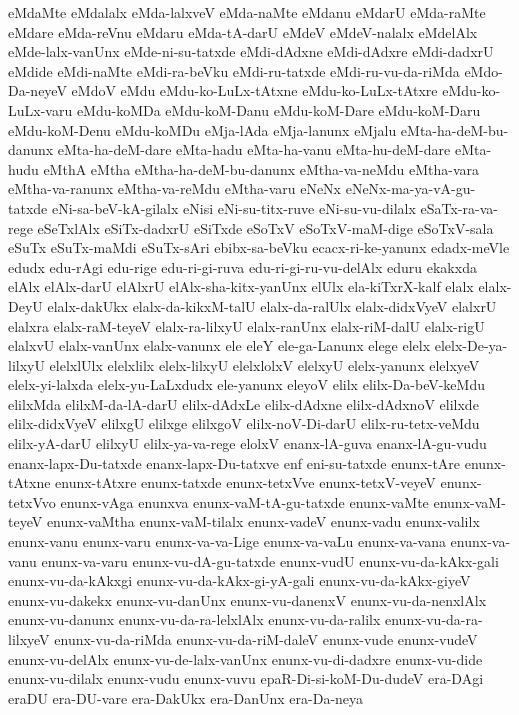 {eMdaMte
eMdalalx
eMda-lalxveV
eMda-naMte
eMdanu
eMdarU
eMda-raMte
eMdare
eMda-reVnu
eMdaru
eMda-tA-darU
eMdeV
eMdeV-nalalx
eMdelAlx
eMde-lalx-vanUnx
eMde-ni-su-tatxde
eMdi-dAdxne
eMdi-dAdxre
eMdi-dadxrU
eMdide
eMdi-naMte
eMdi-ra-beVku
eMdi-ru-tatxde
eMdi-ru-vu-da-riMda
eMdo-Da-neyeV
eMdoV
eMdu
eMdu-ko-LuLx-tAtxne
eMdu-ko-LuLx-tAtxre
eMdu-ko-LuLx-varu
eMdu-koMDa
eMdu-koM-Danu
eMdu-koM-Dare
eMdu-koM-Daru
eMdu-koM-Denu
eMdu-koMDu
eMja-lAda
eMja-lanunx
eMjalu
eMta-ha-deM-bu-danunx
eMta-ha-deM-dare
eMta-hadu
eMta-ha-vanu
eMta-hu-deM-dare
eMta-hudu
eMthA
eMtha
eMtha-ha-deM-bu-danunx
eMtha-va-neMdu
eMtha-vara
eMtha-va-ranunx
eMtha-va-reMdu
eMtha-varu
eNeNx
eNeNx-ma-ya-vA-gu-tatxde
eNi-sa-beV-kA-gilalx
eNisi
eNi-su-titx-ruve
eNi-su-vu-dilalx
eSaTx-ra-va-rege
eSeTxlAlx
eSiTx-dadxrU
eSiTxde
eSoTxV
eSoTxV-maM-dige
eSoTxV-sala
eSuTx
eSuTx-maMdi
eSuTx-sAri
ebibx-sa-beVku
ecacx-ri-ke-yanunx
edadx-meVle
edudx
edu-rAgi
edu-rige
edu-ri-gi-ruva
edu-ri-gi-ru-vu-delAlx
eduru
ekakxda
elAlx
elAlx-darU
elAlxrU
elAlx-sha-kitx-yanUnx
elUlx
ela-kiTxrX-kalf
elalx
elalx-DeyU
elalx-dakUkx
elalx-da-kikxM-talU
elalx-da-ralUlx
elalx-didxVyeV
elalxrU
elalxra
elalx-raM-teyeV
elalx-ra-lilxyU
elalx-ranUnx
elalx-riM-dalU
elalx-rigU
elalxvU
elalx-vanUnx
elalx-vanunx
ele
eleY
ele-ga-Lanunx
elege
elelx
elelx-De-ya-lilxyU
elelxlUlx
elelxlilx
elelx-lilxyU
elelxlolxV
elelxyU
elelx-yanunx
elelxyeV
elelx-yi-lalxda
elelx-yu-LaLxdudx
ele-yanunx
eleyoV
elilx
elilx-Da-beV-keMdu
elilxMda
elilxM-da-lA-darU
elilx-dAdxLe
elilx-dAdxne
elilx-dAdxnoV
elilxde
elilx-didxVyeV
elilxgU
elilxge
elilxgoV
elilx-noV-Di-darU
elilx-ru-tetx-veMdu
elilx-yA-darU
elilxyU
elilx-ya-va-rege
elolxV
enanx-lA-guva
enanx-lA-gu-vudu
enanx-lapx-Du-tatxde
enanx-lapx-Du-tatxve
enf
eni-su-tatxde
enunx-tAre
enunx-tAtxne
enunx-tAtxre
enunx-tatxde
enunx-tetxVve
enunx-tetxV-veyeV
enunx-tetxVvo
enunx-vAga
enunxva
enunx-vaM-tA-gu-tatxde
enunx-vaMte
enunx-vaM-teyeV
enunx-vaMtha
enunx-vaM-tilalx
enunx-vadeV
enunx-vadu
enunx-valilx
enunx-vanu
enunx-varu
enunx-va-va-Lige
enunx-va-vaLu
enunx-va-vana
enunx-va-vanu
enunx-va-varu
enunx-vu-dA-gu-tatxde
enunx-vudU
enunx-vu-da-kAkx-gali
enunx-vu-da-kAkxgi
enunx-vu-da-kAkx-gi-yA-gali
enunx-vu-da-kAkx-giyeV
enunx-vu-dakekx
enunx-vu-danUnx
enunx-vu-danenxV
enunx-vu-da-nenxlAlx
enunx-vu-danunx
enunx-vu-da-ra-lelxlAlx
enunx-vu-da-ralilx
enunx-vu-da-ra-lilxyeV
enunx-vu-da-riMda
enunx-vu-da-riM-daleV
enunx-vude
enunx-vudeV
enunx-vu-delAlx
enunx-vu-de-lalx-vanUnx
enunx-vu-di-dadxre
enunx-vu-dide
enunx-vu-dilalx
enunx-vudu
enunx-vuvu
epaR-Di-si-koM-Du-dudeV
era-DAgi
eraDU
era-DU-vare
era-DakUkx
era-DanUnx
era-Da-neya
}
